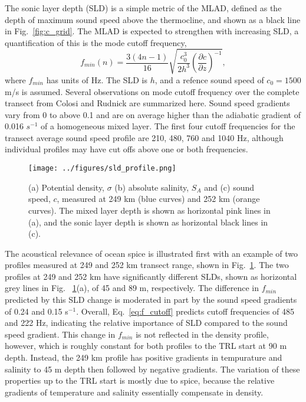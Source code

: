 \documentclass[preprint,NumberedRefs]{JASA}
\begin{document}
The sonic layer depth (SLD) is a simple metric of the MLAD, defined as the depth of maximum sound speed above the thermocline, and shown as a black line in Fig.~\ref{fig:c_grid}. The MLAD is expected to strengthen with increasing SLD, a quantification of this is the mode cutoff frequency\citep{Urick1982Prop},
\begin{equation}
    f_{min}(n) = \frac{3(4n-1)}{16} \sqrt{\frac{c_0^3}{2h^3} \left( \frac{\partial c}{\partial z} \right) ^ {-1}},
    \label{eq:f_cutoff}
\end{equation}
where $f_{min}$ has units of Hz. The SLD is $h$, and a refence sound speed of $c_0 = 1500$ m/s is assumed. Several observations on mode cutoff frequency over the complete transect from Colosi and Rudnick\cite{colosi2020observations} are summarized here. Sound speed gradients vary from 0 to above 0.1 and are on average higher than the adiabatic gradient of 0.016 $s^{-1}$ of a homogeneous mixed layer. The first four cutoff frequencies for the transect average sound speed profile are 210, 480, 760 and 1040 Hz, although individual profiles may have cut offs above one or both frequencies.

\begin{figure}
    \texttt{[image: ../figures/sld\_profile.png]}
    \caption{\label{fig:profiles}{(a) Potential density, $\sigma$ (b) absolute salinity, $S_A$ and (c) sound speed, $c$, measured at 249 km (blue curves) and 252 km (orange curves). The mixed layer depth is shown as horizontal pink lines in (a), and the sonic layer depth is shown as horizontal black lines in (c).}}
\end{figure}

The acoustical relevance of ocean spice is illustrated first with an example of two profiles measured at 249 and 252 km transect range, shown in Fig.~\ref{fig:profiles}. The two profiles at 249 and 252 km have significantly different SLDs, shown as horizontal grey lines in Fig. ~\ref{fig:profiles}(a), of 45 and 89 m, respectively. The difference in $f_{min}$ predicted by this SLD change is moderated in part by the sound speed gradients of 0.24 and 0.15 s$^{-1}$. Overall, Eq.~\eqref{eq:f_cutoff} predicts cutoff frequencies of 485 and 222 Hz, indicating the relative importance of SLD compared to the sound speed gradient. This change in $f_{min}$ is not reflected in the density profile, however, which is roughly constant for both profiles to the TRL start at 90 m depth. Instead, the 249 km profile has positive gradients in tempurature and salinity to 45 m depth then followed by negative gradients. The variation of these properties up to the TRL start is mostly due to spice, because the relative gradients of temperature and salinity essentially compensate in density.
\end{document}
